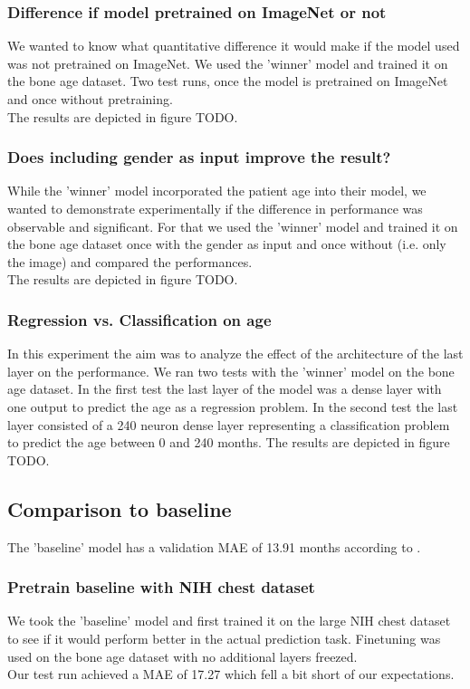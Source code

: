 \documentclass[10pt,twocolumn,letterpaper]{article}
\begin{document}
\subsubsection{Difference if model pretrained on ImageNet or not}
We wanted to know what quantitative difference it would make if the model used was not pretrained on ImageNet.  We used the 'winner' model and trained it on the bone age dataset. Two test runs, once the model is pretrained on ImageNet and once without pretraining.\\
The results are depicted in figure TODO.

\subsubsection{Does including gender as input improve the result?}
While the 'winner' model incorporated the patient age into their model, we wanted to demonstrate experimentally if the difference in performance was observable and significant. For that we used the 'winner' model and trained it on the bone age dataset once with the gender as input and once without (i.e. only the image) and compared the performances. \\
The results are depicted in figure TODO.

\subsubsection{Regression vs. Classification on age}
In this experiment the aim was to analyze the effect of the architecture of the last layer on the performance. We ran two tests with the 'winner' model on the bone age dataset. In the first test the last layer of the model was a dense layer with one output to predict the age as a regression problem. In the second test the last layer consisted of a 240 neuron dense layer representing a classification problem to predict the age between 0 and 240 months.
The results are depicted in figure TODO.

\subsection{Comparison to baseline}
The 'baseline' model has a validation MAE of 13.91 months according to \cite{kaggleboneage}.

\subsubsection{Pretrain baseline \cite{kaggleboneage} with NIH chest dataset}
We took the 'baseline' model and first trained it on the large NIH chest dataset to see if it would perform better in the actual prediction task. Finetuning was used on the bone age dataset with no additional layers freezed. \\
Our test run achieved a MAE of 17.27 which fell a bit short of our expectations.
\end{document}

